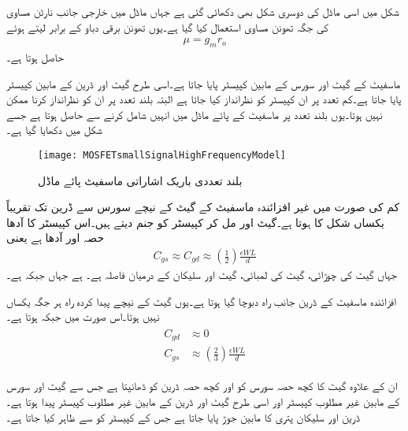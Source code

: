 شکل  میں اسی ماڈل کی دوسری شکل بھی دکھائی گئی ہے جہاں ماڈل میں خارجی جانب نارٹن مساوی کی جگہ تھونن مساوی استعمال کیا گیا ہے۔یوں تھونن برقی دباو  کے برابر لیتے ہوئے
\begin{align*}
\mu=g_m r_o
\end{align*} 
حاصل ہوتا ہے۔

ماسفیٹ کے گیٹ اور سورس کے مابین  کپیسٹر پایا جاتا ہے۔اسی طرح گیٹ اور ڈرین کے مابین  کپیسٹر پایا جاتا ہے۔کم تعدد پر ان کپیسٹر کو نظرانداز کیا جاتا ہے البتہ بلند تعدد پر ان کو نظرانداز کرنا ممکن نہیں ہوتا۔یوں بلند تعدد پر ماسفیٹ کے پائے ماڈل میں انہیں شامل کرنے سے  حاصل ہوتا ہے جسے شکل  میں دکھایا گیا ہے۔
\begin{figure}
\centering
\texttt{[image: MOSFETsmallSignalHighFrequencyModel]}
\caption{بلند تعددی باریک اشاراتی ماسفیٹ پائے ماڈل}
\label{شکل_باریک_اشاراتی_بلند_تعددی_ماسفیٹ_ماڈل}
\end{figure}
کم  کی صورت میں غیر افزائندہ ماسفیٹ کے گیٹ کے  نیچے  سورس سے ڈرین تک تقریباً یکساں شکل کا ہوتا ہے۔گیٹ اور  مل کر کپیسٹر  کو جنم دیتے ہیں۔اس کپیسٹر کا آدھا حصہ  اور آدھا  ہے یعنی
\begin{align}
C_{gs} \approx C_{gd} \approx \left(\frac{1}{2} \right)\frac{\epsilon W L}{d}
\end{align} 
جہاں   گیٹ کی چوڑائی،  گیٹ کی لمبائی،  گیٹ اور سلیکان کے درمیان فاصلہ ہے۔ ہے جہاں  جبکہ  ہے۔

افزائندہ ماسفیٹ کے ڈرین جانب راہ دبوچا گیا ہوتا ہے۔یوں گیٹ کے نیچے پیدا کردہ راہ ہر جگہ یکساں نہیں  ہوتا۔اس صورت میں  جبکہ  ہوتا ہے۔
\begin{gather}
\begin{aligned}
C_{gd}& \approx 0\\
C_{gs}& \approx \left(\frac{2}{3}\right) \frac{\epsilon WL}{d}
\end{aligned}
\end{gather} 

ان کے علاوہ گیٹ کا کچھ حصہ سورس کو اور کچھ حصہ ڈرین کو ڈھانپتا ہے  جس سے گیٹ اور سورس کے مابین غیر مطلوب کپیسٹر  اور اسی طرح گیٹ اور ڈرین کے مابین غیر مطلوب کپیسٹر  پیدا ہوتا ہے۔ڈرین اور سلیکان پتری کا مابین  جوڑ پایا جاتا ہے جس کے کپیسٹر کو  سے ظاہر کیا جاتا ہے۔

